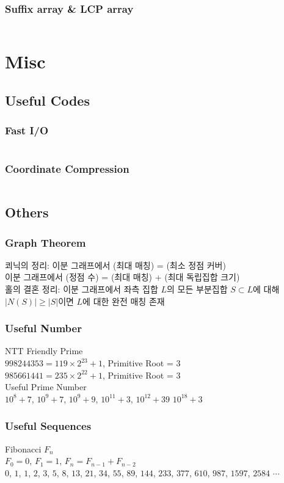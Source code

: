 \documentclass[a4paper,landscape,9pt,twocolumn]{article}
\begin{document}
\subsubsection{Suffix array \& LCP array}
\inputminted{python}{codes/string/salcp.py}

\section{Misc}
\subsection{Useful Codes}
\subsubsection{Fast I/O}
\inputminted{python}{codes/misc/fastio.py}
\subsubsection{Coordinate Compression}
\inputminted{python}{codes/misc/compress.py}
\subsection{Others}
\subsubsection{Graph Theorem}
쾨닉의 정리: 이분 그래프에서 (최대 매칭) = (최소 정점 커버) \\
이분 그래프에서 (정점 수) = (최대 매칭) + (최대 독립집합 크기) \\
홀의 결혼 정리: 이분 그래프에서 좌측 집합 $L$의 모든 부분집합 $S \subset L$에 대해 $|N(S)| \ge |S|$이면 $L$에 대한 완전 매칭 존재
\subsubsection{Useful Number}
NTT Friendly Prime \\
$ 998244353 = 119 \times 2^{23} + 1 $, Primitive Root = $3$ \\
$ 985661441 = 235 \times 2^{22} + 1 $, Primitive Root = $3$ \\
Useful Prime Number \\
$10^{8} + 7$, $10^{9} + 7$, $10^{9} + 9$, $10^{11} + 3$, $10^{12} + 39$ $10^{18} + 3$ \\

\subsubsection{Useful Sequences}
Fibonacci $F_n$ \\
$F_0 = 0$, $F_1 = 1$, $F_n = F_{n-1} + F_{n-2}$ \\
$0$, $1$, $1$, $2$, $3$, $5$, $8$, $13$, $21$, $34$, $55$, $89$, $144$, $233$, $377$, $610$, $987$, $1597$, $2584$ $\cdots$
\newline
\end{document}
